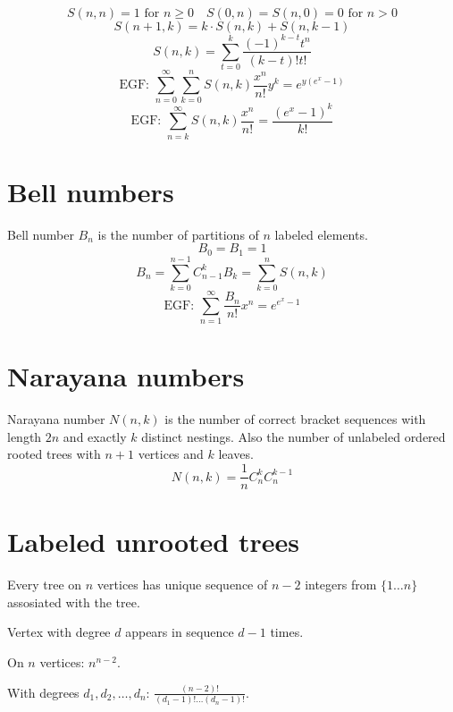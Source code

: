 $$S(n, n) = 1 \text{ for } n \ge 0 \quad S(0, n) = S(n, 0) = 0 \text{ for } n > 0$$
$$S(n + 1, k) = k \cdot S(n, k) + S(n, k - 1)$$
$$S(n, k) = \sum_{t = 0}^{k} \frac{(-1)^{k - t}t^n}{(k - t)!t!}$$
$$\text{EGF: } \sum_{n = 0}^{\infty}\sum_{k=0}^{n} S(n, k)\frac{x^n}{n!}y^k = e^{y(e^x - 1)}$$
$$\text{EGF: } \sum_{n = k}^{\infty} S(n, k)\frac{x^n}{n!} = \frac{(e^x - 1)^k}{k!}$$




\section{Bell numbers}
Bell number $B_n$ is the number of partitions of $n$ labeled elements.
$$B_0 = B_1 = 1$$
$$B_n = \sum_{k = 0}^{n - 1} C_{n - 1}^k B_k = \sum_{k = 0}^{n} S(n, k)$$
$$\text{EGF: } \sum_{n = 1}^{\infty}\frac{B_n}{n!}x^n = e^{e^x - 1}$$




\section{Narayana numbers}
Narayana number $N(n, k)$ is the number of correct bracket sequences with length $2n$ and exactly $k$ distinct nestings. Also the number of unlabeled ordered rooted trees with $n + 1$ vertices and $k$ leaves.
$$N(n, k) = \frac{1}{n}C_{n}^{k}C_{n}^{k - 1}$$



\section{Labeled unrooted trees}
Every tree on $n$ vertices has unique sequence of $n - 2$ integers from $\{1 \dots n\}$ assosiated with the tree.

Vertex with degree $d$ appears in sequence $d - 1$ times.

On $n$ vertices: $n^{n - 2}$.

With degrees $d_1, d_2, \dots, d_n$: $\frac{(n - 2)!}{(d_1 - 1)! \dots (d_n - 1)!}$.
